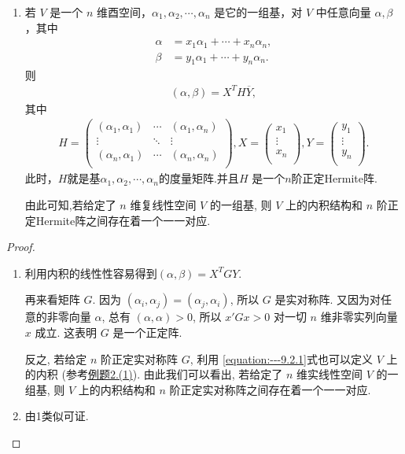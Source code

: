 \documentclass[../../main.tex]{subfiles}
\begin{document}
\begin{theorem}
\begin{enumerate}
\item 若 \(V\) 是一个 \(n\) 维酉空间，\(\alpha_1,\alpha_2,\cdots,\alpha_n\) 是它的一组基，对 \(V\) 中任意向量 \(\alpha,\beta\)，其中
\begin{align*}
\alpha&=x_1\alpha_1+\cdots + x_n\alpha_n,\\
\beta&=y_1\alpha_1+\cdots + y_n\alpha_n.
\end{align*}
则
\begin{align*}
(\alpha,\beta)=X^TH\overline{Y},
\end{align*}
其中
\begin{align*}
H=\left( \begin{matrix}
\left( \alpha _1,\alpha _1 \right)&		\cdots&		\left( \alpha _1,\alpha _n \right)\\
\vdots&		\ddots&		\vdots\\
\left( \alpha _n,\alpha _1 \right)&		\cdots&		\left( \alpha _n,\alpha _n \right)\\
\end{matrix} \right) ,X=\left( \begin{array}{c}
x_1\\
\vdots\\
x_n\\
\end{array} \right) ,Y=\left( \begin{array}{c}
y_1\\
\vdots\\
y_n\\
\end{array} \right) .
\end{align*}
此时，$H$就是基\(\alpha_1,\alpha_2,\cdots,\alpha_n\)的度量矩阵.并且$H$ 是一个$n$阶正定Hermite阵.

由此可知,若给定了 $n$ 维复线性空间 $V$ 的一组基, 则 $V$ 上的内积结构和 $n$ 阶正定Hermite阵之间存在着一个一一对应. 
\end{enumerate} 
\end{theorem}
\begin{proof}
\begin{enumerate}
\item 利用内积的线性性容易得到$(\alpha,\beta)=X^TGY$.
 
再来看矩阵 $G$. 因为 $(\alpha_i, \alpha_j) = (\alpha_j, \alpha_i)$, 所以 $G$ 是实对称阵. 又因为对任意的非零向量 $\alpha$, 总有 $(\alpha, \alpha) > 0$, 所以 $x'Gx > 0$ 对一切 $n$ 维非零实列向量 $x$ 成立. 这表明 $G$ 是一个正定阵. 

反之, 若给定 $n$ 阶正定实对称阵 $G$, 利用 \eqref{equation:---9.2.1}式也可以定义 $V$ 上的内积 (参考\hyperref[example:一些常见的内积及内积空间]{例题2.(1)}). 由此我们可以看出, 若给定了 $n$ 维实线性空间 $V$ 的一组基, 则 $V$ 上的内积结构和 $n$ 阶正定实对称阵之间存在着一个一一对应. 

\item 由1类似可证.
\end{enumerate}

\end{proof}
\end{document}
